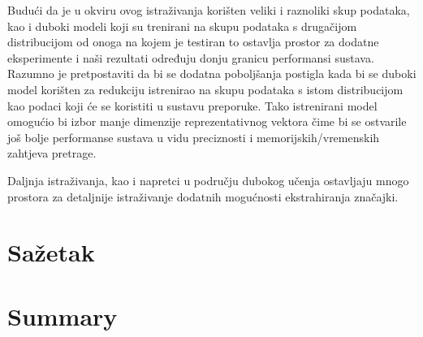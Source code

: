 \documentclass[times, utf8, proizvoljni, numeric]{fer}
\begin{document}
Budući da je u okviru ovog istraživanja korišten veliki i raznoliki skup podataka, kao i duboki modeli koji su trenirani na skupu podataka s drugačijom distribucijom od onoga na kojem je testiran to ostavlja prostor za dodatne eksperimente i naši rezultati određuju donju granicu performansi sustava. Razumno je pretpostaviti da bi se dodatna poboljšanja postigla kada bi se duboki model korišten za redukciju istrenirao na skupu podataka s istom distribucijom kao podaci koji će se koristiti u sustavu preporuke. Tako istrenirani model omogućio bi izbor manje dimenzije reprezentativnog vektora čime bi se ostvarile još bolje performanse sustava u vidu preciznosti i memorijskih/vremenskih zahtjeva pretrage.

Daljnja istraživanja, kao i napretci u području dubokog učenja ostavljaju mnogo prostora za detaljnije istraživanje dodatnih mogućnosti ekstrahiranja značajki.

\chapter{Sažetak}


\chapter{Summary}



\end{document}
